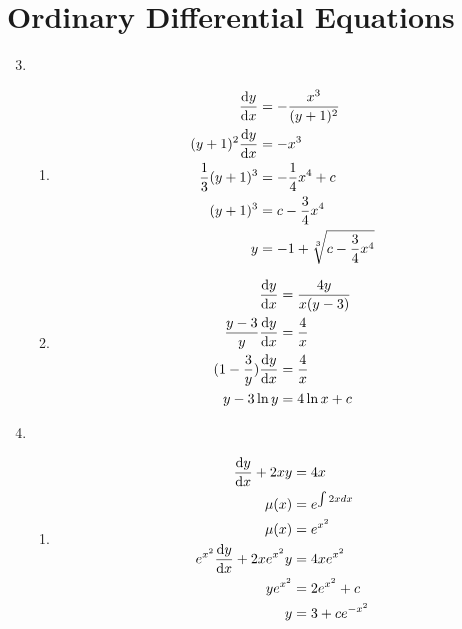 \documentclass[10pt,\jkfside,a4paper]{article}
\begin{document}
\section*{Ordinary Differential Equations}

\begin{enumerate}
\setcounter{enumi}{2}

\item
\begin{enumerate}

\item
\begin{equation}
\begin{split}
\dv{y}{x} &= - \frac{x^3}{(y + 1)^2}\\
(y + 1)^2 \dv{y}{x} &= -x^3\\
\frac{1}{3}(y + 1)^3 &= -\frac{1}{4}x^4 + c\\
(y + 1)^3 &= c - \frac{3}{4}x^4\\
y &= -1 + \sqrt[3]{c - \frac{3}{4}x^4}\\
\end{split}
\end{equation}

\item 
\begin{equation}
\begin{split}
\dv{y}{x} &= \frac{4y}{x(y - 3)}\\
\frac{y - 3}{y}\dv{y}{x} &= \frac{4}{x}\\
(1 - \frac{3}{y})\dv{y}{x} &= \frac{4}{x}\\
y - 3\ln{y} &= 4\ln{x} + c\\
\end{split}
\end{equation}

\end{enumerate}

\item
\begin{enumerate}

\item
\begin{equation}
\begin{split}
\dv{y}{x} + 2xy &= 4x\\
\mu(x) &= e^{\int 2x dx}\\
\mu(x) &= e^{x^2}\\
e^{x^2}\dv{y}{x} + 2xe^{x^2}y &= 4xe^{x^2}\\
ye^{x^2} &= 2e^{x^2} + c\\
y &= 3 + ce^{-x^2}\\
\end{split}
\end{equation}


\end{enumerate}
\end{enumerate}
\end{document}

